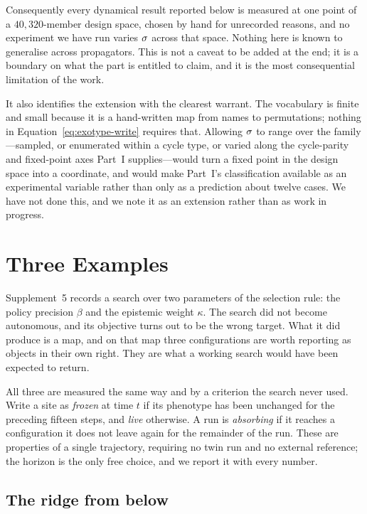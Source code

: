 Consequently every dynamical result reported below is measured at one point of a
$40{,}320$-member design space, chosen by hand for unrecorded reasons, and no
experiment we have run varies $\sigma$ across that space. Nothing here is known to
generalise across propagators. This is not a caveat to be added at the end; it
is a boundary on what the part is entitled to claim, and it is the most
consequential limitation of the work.

It also identifies the extension with the clearest warrant. The vocabulary is
finite and small because it is a hand-written map from names to permutations;
nothing in Equation~\eqref{eq:exotype-write} requires that. Allowing $\sigma$ to
range over the family---sampled, or enumerated within a cycle type, or varied
along the cycle-parity and fixed-point axes Part~I supplies---would turn a fixed
point in the design space into a coordinate, and would make Part~I's
classification available as an experimental variable rather than only as a
prediction about twelve cases. We have not done this, and we note it as an
extension rather than as work in progress.

\section{Three Examples}
\label{sec:exotype-examples}

Supplement~5 records a search over two parameters of the selection rule: the
policy precision $\beta$ and the epistemic weight $\kappa$. The search did not
become autonomous, and its objective turns out to be the wrong target. What it
did produce is a map, and on that map three configurations are worth reporting
as objects in their own right. They are what a working search would have been
expected to return.

All three are measured the same way and by a criterion the search never used.
Write a site as \emph{frozen} at time $t$ if its phenotype has been unchanged for
the preceding fifteen steps, and \emph{live} otherwise. A run is \emph{absorbing}
if it reaches a configuration it does not leave again for the remainder of the
run. These are properties of a single
trajectory, requiring no twin run and no external reference; the horizon is the
only free choice, and we report it with every number.

\subsection{The ridge from below}

